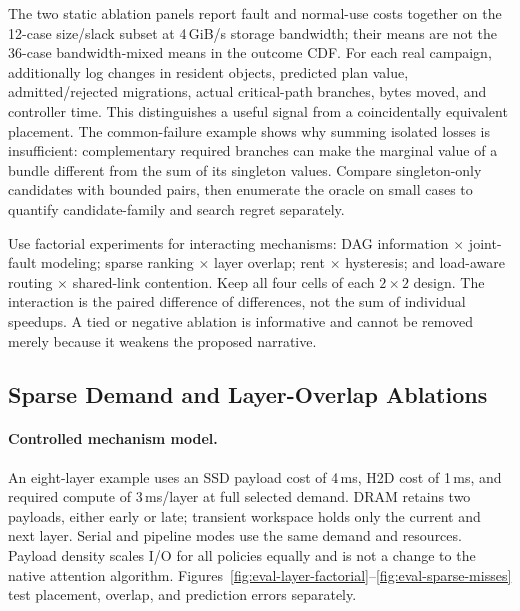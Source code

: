 \documentclass[sigplan,10pt,anonymous,nonacm]{acmart}
\begin{document}
The two static ablation panels report fault and normal-use costs together
on the 12-case size/slack subset at 4\,GiB/s storage bandwidth; their
means are not the 36-case bandwidth-mixed means in the outcome CDF.
For each real campaign, additionally log changes in resident objects,
predicted plan value, admitted/rejected migrations, actual critical-path
branches, bytes moved, and controller time. This distinguishes a useful
signal from a coincidentally equivalent placement. The common-failure
example shows why summing isolated losses is insufficient: complementary
required branches can make the marginal value of a bundle different
from the sum of its singleton values. Compare singleton-only candidates
with bounded pairs, then enumerate the oracle on small cases to quantify
candidate-family and search regret separately.

Use factorial experiments for interacting mechanisms: DAG information
$\times$ joint-fault modeling; sparse ranking $\times$ layer overlap;
rent $\times$ hysteresis; and load-aware routing $\times$ shared-link
contention. Keep all four cells of each $2\!\times\!2$ design. The
interaction is the paired difference of differences, not the sum of
individual speedups. A tied or negative ablation is informative and
cannot be removed merely because it weakens the proposed narrative.

\FloatBarrier
\subsection{Sparse Demand and Layer-Overlap Ablations}

\paragraph{Controlled mechanism model.}
An eight-layer example uses an SSD payload cost of 4\,ms, H2D cost of
1\,ms, and required compute of 3\,ms/layer at full selected demand.
DRAM retains two payloads, either early or late; transient workspace
holds only the current and next layer. Serial and pipeline modes use
the same demand and resources. Payload density scales I/O for all
policies equally and is not a change to the native attention algorithm.
Figures~\ref{fig:eval-layer-factorial}--\ref{fig:eval-sparse-misses}
test placement, overlap, and prediction errors separately.
\end{document}
